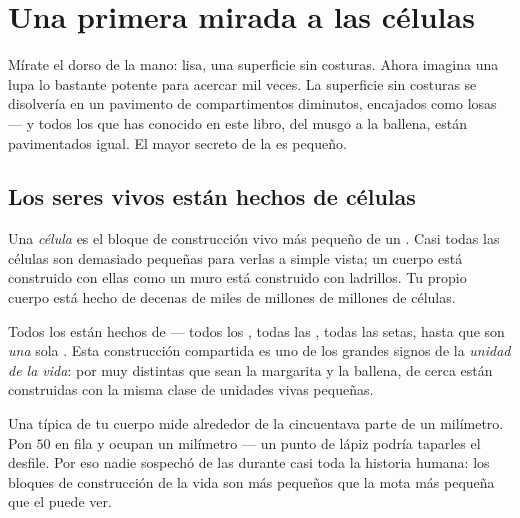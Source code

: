 \chapter{Una primera mirada a las células}\label{ch:g5:first-look-at-cells}

Mírate el dorso de la mano:  lisa, una superficie sin costuras.
Ahora imagina una lupa lo bastante potente para acercar mil veces. La
superficie sin costuras se disolvería en un pavimento de
compartimentos diminutos, encajados como losas --- y todos los  que has conocido en este libro, del musgo a la ballena, están
pavimentados igual. El mayor secreto de la  es pequeño.

\section{Los seres vivos están hechos de células}

\begin{definition}[Célula]\label{def:g5:first-look-at-cells:cell}
Una \emph{célula} es el bloque de construcción vivo más
pequeño de un . Casi todas las células son demasiado pequeñas
para verlas a simple vista; un cuerpo está construido con ellas como
un muro está construido con ladrillos. Tu propio cuerpo está hecho de
decenas de miles de millones de millones de células.
\end{definition}

\begin{proposition}\label{prop:g5:first-look-at-cells:principle}
Todos los  están hechos de  --- todos los ,
todas las , todas las setas, hasta  que son
\emph{una} sola . Esta construcción compartida es uno de los
grandes signos de la \emph{unidad de la vida}: por muy distintas que sean la margarita y la ballena, de cerca
están construidas con la misma clase de unidades vivas pequeñas.
\end{proposition}
\admitted

\begin{example}\label{ex:g5:first-look-at-cells:small}
Una  típica de tu cuerpo mide alrededor de la cincuentava parte
de un milímetro. Pon $50$ en fila y ocupan un milímetro --- un punto
de lápiz podría taparles el desfile. Por eso nadie sospechó de las
 durante casi toda la historia humana: los bloques de
construcción de la vida son más pequeños que la mota más pequeña que
el  puede ver.
\end{example}

